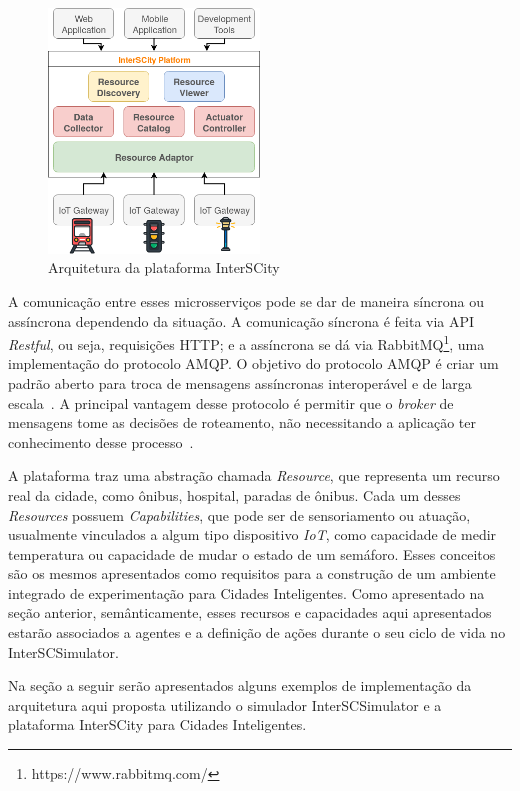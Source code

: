 \begin{figure}[ht]
	\centering
	\includegraphics[width=0.5\textwidth]{figuras/platform_architecture.png}
	\caption{Arquitetura da plataforma InterSCity}
	\label{fig:platform_architecture}
\end{figure}

A comunicação entre esses microsserviços pode se dar de maneira síncrona ou assíncrona dependendo da situação.
A comunicação síncrona é feita via API \textit{Restful}, ou seja, requisições HTTP; e a assíncrona se dá via RabbitMQ\footnote{https://www.rabbitmq.com/}, uma implementação do protocolo AMQP.
O objetivo do protocolo AMQP é criar um padrão aberto para troca de mensagens assíncronas interoperável e de larga escala~\cite{vinoski_2006}.
A principal vantagem desse protocolo é permitir que o \textit{broker} de mensagens tome as decisões de roteamento, não necessitando a aplicação ter conhecimento
desse processo~\cite{vinoski_2006}.

A plataforma traz uma abstração chamada \textit{Resource}, que representa um recurso real da cidade, como ônibus, hospital, paradas de ônibus.
Cada um desses \textit{Resources} possuem \textit{Capabilities}, que pode ser de sensoriamento ou atuação, usualmente vinculados a algum tipo dispositivo \textit{IoT},
como capacidade de medir temperatura ou capacidade de mudar o estado de um semáforo.
Esses conceitos são os mesmos apresentados como requisitos para a construção de um ambiente integrado de experimentação para Cidades Inteligentes.
Como apresentado na seção anterior, semânticamente, esses recursos e capacidades aqui apresentados estarão associados a agentes e a definição de ações durante o seu
ciclo de vida no InterSCSimulator.

Na seção a seguir serão apresentados alguns exemplos de implementação da arquitetura aqui proposta utilizando o simulador InterSCSimulator e a plataforma InterSCity
para Cidades Inteligentes.

